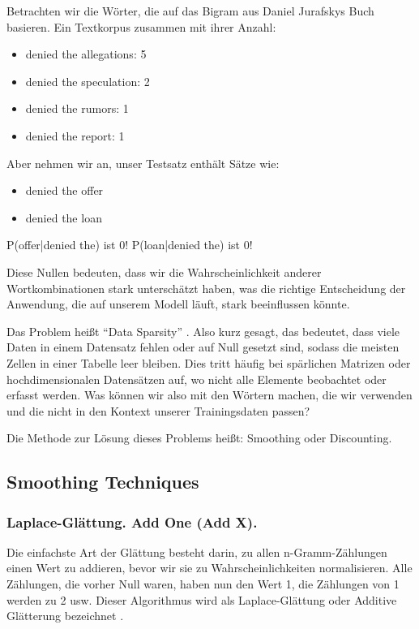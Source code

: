 \documentclass[12pt]{article}
\begin{document}
Betrachten wir die Wörter, die auf das Bigram aus Daniel Jurafskys Buch basieren. Ein Textkorpus zusammen mit ihrer Anzahl:

\begin{itemize}
	\item denied the allegations: 5
	\item denied the speculation: 2
	\item denied the rumors: 1
	\item denied the report: 1
\end{itemize}

Aber nehmen wir an, unser Testsatz enthält Sätze wie:
\begin{itemize}
	\item denied the offer
	\item denied the loan
\end{itemize}

P(offer|denied the) ist 0!
P(loan|denied the) ist 0!

Diese Nullen bedeuten, dass wir die Wahrscheinlichkeit anderer Wortkombinationen stark unterschätzt haben, was die richtige Entscheidung der Anwendung, die auf unserem Modell läuft, stark beeinflussen könnte.

Das Problem heißt “Data Sparsity” \cite{dremio2023}. Also kurz gesagt, das bedeutet, dass viele Daten in einem Datensatz fehlen oder auf Null gesetzt sind, sodass die meisten Zellen in einer Tabelle leer bleiben. Dies tritt häufig bei spärlichen Matrizen oder hochdimensionalen Datensätzen auf, wo nicht alle Elemente beobachtet oder erfasst werden. Was können wir also mit den Wörtern machen, die wir verwenden und die nicht in den Kontext unserer Trainingsdaten passen?

Die Methode zur Lösung dieses Problems heißt: Smoothing oder Discounting.

\subsection{Smoothing Techniques}
\subsubsection{Laplace-Glättung. Add One (Add X).}
Die einfachste Art der Glättung besteht darin, zu allen n-Gramm-Zählungen einen Wert zu addieren, bevor wir sie zu Wahrscheinlichkeiten normalisieren. Alle Zählungen, die vorher Null waren, haben nun den Wert 1, die Zählungen von 1 werden zu 2 usw. Dieser Algorithmus wird als Laplace-Glättung oder Additive Glätterung bezeichnet \cite{foster2020}.
\end{document}

